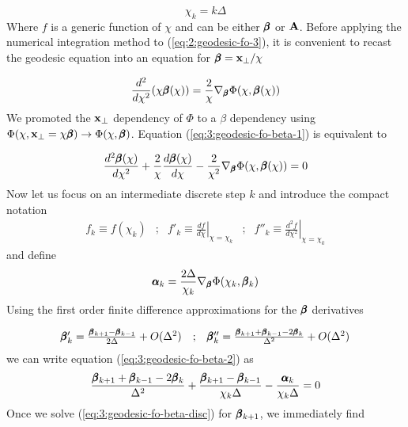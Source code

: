 \begin{equation}
\label{eq:3:int-steps}
\chi_k = k\Delta
\end{equation}  
%
Where $f$ is a generic function of $\chi$ and can be either $\pmb{\beta}$ or $\mathbf{A}$. Before applying the numerical integration method to (\ref{eq:2:geodesic-fo-3}), it is convenient to recast the geodesic equation into an equation for $\pmb{\beta}=\mathbf{x}_\perp/\chi$ 

\begin{equation}
\label{eq:3:geodesic-fo-beta-1}
\frac{d^2}{d\chi^2}(\chi\pmb{\beta}(\chi)) = \frac{2}{\chi}\nabla_{\pmb{\beta}}\Phi(\chi,\pmb{\beta}(\chi))
\end{equation} 
%
We promoted the $\mathbf{x}_\perp$ dependency of $\Phi$ to a $\beta$ dependency using $\Phi(\chi,\mathbf{x}_\perp=\chi\pmb{\beta})\rightarrow\Phi(\chi,\pmb{\beta})$. Equation (\ref{eq:3:geodesic-fo-beta-1}) is equivalent to 

\begin{equation}
\label{eq:3:geodesic-fo-beta-2}
\frac{d^2\pmb{\beta}(\chi)}{d\chi^2} + \frac{2}{\chi}\frac{d\pmb{\beta}(\chi)}{d\chi} - \frac{2}{\chi^2}\nabla_{\pmb{\beta}}\Phi(\chi,\pmb{\beta}(\chi)) = 0
\end{equation}
%
Now let us focus on an intermediate discrete step $k$ and introduce the compact notation 
\begin{equation}
\label{eq:3:compactnotation}
\begin{matrix}
f_k\equiv f(\chi_k) & ; & f'_k\equiv\left.\frac{df}{d\chi}\right\vert_{\chi=\chi_k} & ; & f''_k\equiv\left.\frac{d^2f}{d\chi^2}\right\vert_{\chi=\chi_k}
\end{matrix}
\end{equation}  
%
and define
\begin{equation}
\label{eq:3:alphak}
\pmb{\alpha}_k = \frac{2\Delta}{\chi_k}\nabla_{\pmb{\beta}}\Phi(\chi_k,\pmb{\beta}_k)
\end{equation}
%
Using the first order finite difference approximations for the $\pmb{\beta}$ derivatives

\begin{equation}
\label{eq:3:finitediff}
\begin{matrix}
\pmb{\beta}'_k = \frac{\pmb{\beta}_{k+1}-\pmb{\beta}_{k-1}}{2\Delta} + O(\Delta^2) & ; & \pmb{\beta}''_k = \frac{\pmb{\beta}_{k+1}+\pmb{\beta}_{k-1}-2\pmb{\beta}_k}{\Delta^2} + O(\Delta^2)
\end{matrix}
\end{equation}
%
we can write equation (\ref{eq:3:geodesic-fo-beta-2}) as 
\begin{equation}
\label{eq:3:geodesic-fo-beta-disc}
\frac{\pmb{\beta}_{k+1}+\pmb{\beta}_{k-1}-2\pmb{\beta}_k}{\Delta^2} + \frac{\pmb{\beta}_{k+1}-\pmb{\beta}_{k-1}}{\chi_k\Delta} - \frac{\pmb{\alpha}_k}{\chi_k\Delta} = 0
\end{equation} 
%
Once we solve (\ref{eq:3:geodesic-fo-beta-disc}) for $\pmb{\beta}_{k+1}$, we immediately find

